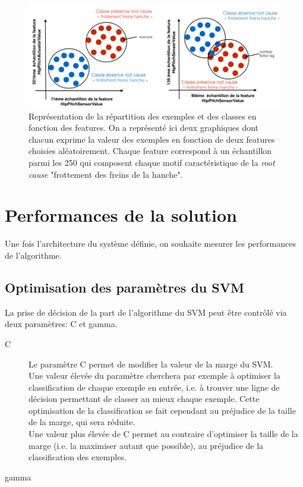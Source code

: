 \begin{figure}[h]
	\centering\includegraphics[width=12cm]{images/classes_sys.png}
	\caption[Représentation de la répartition des exemples et des classes en fonction des features,  approche fonctionnelle]{Représentation de la répartition des exemples et des classes en fonction des features. On a représenté ici deux graphiques dont chacun exprime la valeur des exemples en fonction de deux features choisies aléatoirement. Chaque feature correspond à un échantillon parmi les 250 qui composent chaque motif caractéristique de la \emph{root cause} "frottement des freins de la hanche".}
	\label{fig:Courbe de probabilité de la root cause "frottement des freins de la hanche"}
\end{figure}



\section{Performances de la solution}
\label{Automatisation du processus d'investigation: Performances de la solution}
Une fois l'architecture du système définie, on souhaite mesurer les performances de l'algorithme.

\subsection{Optimisation des paramètres du SVM}
\label{Industrialisation du produit: Performances de la solution:Optimisation des paramètres du SVM}
La prise de décision de la part de l'algorithme du SVM peut être contrôlé via deux paramètres: C et gamma.
\begin{description}
	\item [C] Le paramètre C permet de modifier la valeur de la marge du SVM. \\
	Une valeur élevée du paramètre cherchera par exemple à optimiser la classification de chaque exemple en entrée, i.e. à trouver une ligne de décision permettant de classer au mieux chaque exemple. Cette optimisation de la classification se fait cependant au préjudice de la taille de la marge, qui sera réduite. \\
	Une valeur plus élevée de C permet au contraire d'optimiser la taille de la marge (i.e. la maximiser autant que possible), au préjudice de la classification des exemples.
	\item [gamma] 
\end{description}

